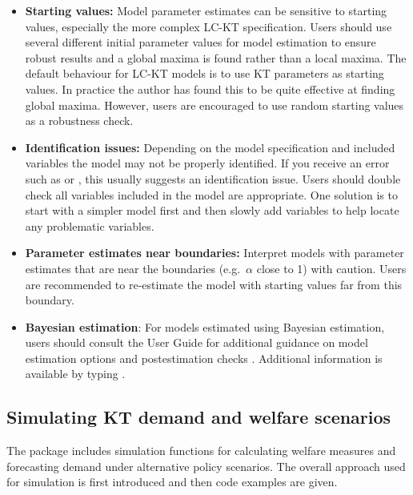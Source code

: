 \begin{itemize}
\item
  \textbf{Starting values:} Model parameter estimates can be sensitive
  to starting values, especially the more complex LC-KT specification.
  Users should use several different initial parameter values for model
  estimation to ensure robust results and a global maxima is found
  rather than a local maxima. The default behaviour for LC-KT models is
  to use KT parameters as starting values. In practice the author has
  found this to be quite effective at finding global maxima. However,
  users are encouraged to use random starting values as a robustness
  check.
\item
  \textbf{Identification issues:} Depending on the model specification
  and included variables the model may not be properly identified. If
  you receive an error such as
  or , this usually
  suggests an identification issue. Users should double check all
  variables included in the model are appropriate. One solution is to
  start with a simpler model first and then slowly add variables to help
  locate any problematic variables.
\item
  \textbf{Parameter estimates near boundaries:} Interpret models with
  parameter estimates that are near the boundaries (e.g.~\(\alpha\)
  close to 1) with caution. Users are recommended to re-estimate the
  model with starting values far from this boundary.
\item
  \textbf{Bayesian estimation}: For models estimated using Bayesian
  estimation, users should consult the  User Guide for
  additional guidance on model estimation options and postestimation
  checks \citep{stan2019}. Additional information is available by typing
  .
\end{itemize}

\hypertarget{simulating-kt-demand-and-welfare-scenarios}{%
\subsection{Simulating KT demand and welfare
scenarios}\label{simulating-kt-demand-and-welfare-scenarios}}

The  package includes simulation functions for calculating
welfare measures and forecasting demand under alternative policy
scenarios. The overall approach used for simulation is first introduced
and then code examples are given.

